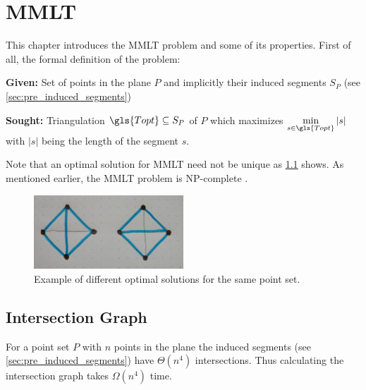 \chapter{\glsdesc{MMLT}}

This chapter introduces the \gls{MMLT} problem and
some of its properties. First of all, the formal definition
of the problem:

\begin{problem}
  \hfill
	\begin{labeling}{\hspace{4em}}
		\item[\textbf{Given:}]
			Set of points in the plane \(P\) and implicitly their induced segments
			\(S_P\) (see \cref{sec:pre_induced_segments})
		\item[\textbf{Sought:}]
			Triangulation \(\gls{Topt}\subseteq S_P\) of \(P\) which maximizes
			\(\min\limits_{s\in \gls{Topt}} |s|\) 
			with \(|s|\) being the length of the segment \(s\).
	\end{labeling}
\end{problem}

Note that an optimal solution for \gls{MMLT} need not be unique as
\cref{fig:non_unique_optimal} shows. As mentioned earlier, the
\gls{MMLT} problem is NP-complete \cite{mmlt_complexity}.

\begin{figure}[ht]
  \centering
  \includegraphics[width=0.5\textwidth]{img/non_unique_optimal.jpg}
  \caption{Example of different optimal solutions for the same point set.\label{fig:non_unique_optimal}}
\end{figure}




\section{Intersection Graph}\label{sec:pre_intersection_graph}
For a point set \(P\) with \(n\) points in the plane 
the induced segments (see
\cref{sec:pre_induced_segments}) have \(\Theta(n^4)\) intersections.
\cite{quadrilaterals_bound} Thus calculating the intersection graph
takes \(\Omega(n^4)\) time.

